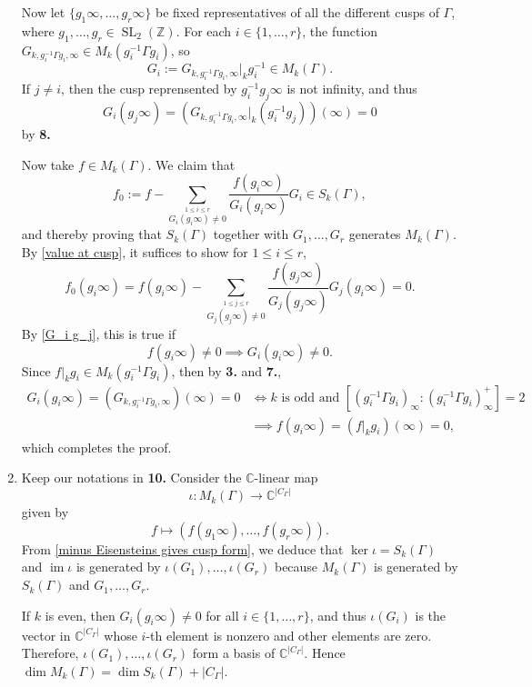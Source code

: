 \documentclass{article}
\theoremstyle{definition}
\theoremstyle{remark}
\newcommand{\C}{\mathbb{C}}
\newcommand{\Z}{\mathbb{Z}}
\DeclareMathOperator{\SL}{SL}
\DeclareMathOperator{\im}{im} %
\begin{document}
\begin{enumerate}
Now let $\{g_1\infty, \dots, g_r\infty\}$ be fixed representatives of all the different cusps of $\Gamma$, where $g_1, \dots, g_r\in\SL_2(\Z)$.
For each $i \in \{1, \dots, r\}$,
the function $G_{k, g_i^{-1}\Gamma g_i, \infty}\in M_k(g_i^{-1}\Gamma g_i)$, so \[G_i := G_{k, g_i^{-1}\Gamma g_i, \infty}|_{k}g_i^{-1}\in M_k(\Gamma).\]
If $j\ne i$, then the cusp reprensented by $g_i^{-1}g_j\infty$ is not infinity, and thus
\begin{equation}\label{G_i g_j}
    G_i(g_j\infty) = \left( G_{k, g_i^{-1}\Gamma g_i, \infty}|_k (g_i^{-1}g_j) \right)(\infty) = 0
\end{equation} by \textbf{8.}

Now take $f\in M_k(\Gamma)$. 
We claim that \begin{equation}\label{minus Eisensteins gives cusp form}
    f_0 := f - \sum_{\stackrel{1\le i\le r}{G_i(g_i\infty)\ne 0}}\frac{f(g_i\infty)}{G_i(g_i\infty)} G_{i}\in S_k(\Gamma),
\end{equation}
and thereby proving that $S_k(\Gamma)$ together with $G_1, \dots, G_r$ generates $M_k(\Gamma)$.
By \cref{value at cusp}, it suffices to show for $1\le i\le r$,
\[f_0(g_i\infty) = f(g_i\infty) - \sum_{\stackrel{1\le j\le r}{G_j(g_j\infty)\ne 0}}\frac{f(g_j\infty)}{G_j(g_j\infty)} G_{j}(g_i\infty) = 0.\]
By \cref{G_i g_j}, this is true if \[f(g_i\infty)\ne 0\implies G_i(g_i\infty)\ne 0.\]
Since $f|_kg_i\in M_k(g_i^{-1}\Gamma g_i)$, then by \textbf{3.} and \textbf{7.}, \begin{align*}
    G_i(g_i\infty) = \left( G_{k, g_i^{-1}\Gamma g_i, \infty} \right)(\infty) = 0
    &\iff k\text{ is odd and } [(g_i^{-1}\Gamma g_i)_\infty : (g_i^{-1}\Gamma g_i)_\infty^+] = 2 \\
    &\implies f(g_i\infty) = (f|_kg_i)(\infty) = 0,
\end{align*}
which completes the proof.

\item 
Keep our notations in \textbf{10.}
Consider the $\C$-linear map \[ \iota:   M_k(\Gamma)\to \C^{|C_\Gamma|}
\] given by \begin{equation}\label{embed M_k(Gamma) in to S_k(Gamma) times somthing}
    f\mapsto (f(g_1\infty), \dots, f(g_r\infty)).
\end{equation}
From \cref{minus Eisensteins gives cusp form}, we deduce that $\ker\iota = S_k(\Gamma)$ and $\im\iota$ is generated by $\iota(G_1), \dots, \iota(G_r)$ because $M_k(\Gamma)$ is generated by $S_k(\Gamma)$ and $G_1, \dots, G_r$.

If $k$ is even, then $G_i(g_i\infty) \ne 0$ for all $i\in\{1, \dots, r\}$, and thus $\iota(G_i)$ is the vector in $\C^{|C_\Gamma|}$ whose $i$-th element is nonzero and other elements are zero. Therefore, $\iota(G_1), \dots, \iota(G_r)$ form a basis of $\C^{|C_\Gamma|}$. Hence $\dim M_k(\Gamma) = \dim S_k(\Gamma) + |C_\Gamma|$.


\end{enumerate}
\end{document}
